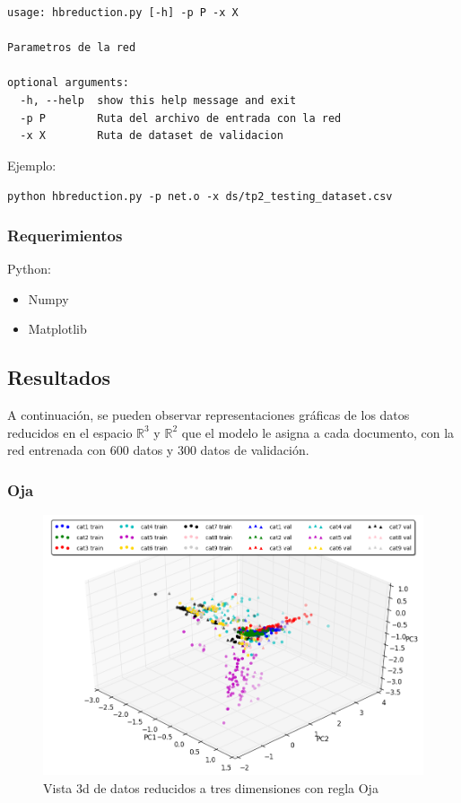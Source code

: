 \begin{lstlisting}[style=bash]
usage: hbreduction.py [-h] -p P -x X

Parametros de la red

optional arguments:
  -h, --help  show this help message and exit
  -p P        Ruta del archivo de entrada con la red
  -x X        Ruta de dataset de validacion
\end{lstlisting}

Ejemplo:

\noindent\texttt{python hbreduction.py -p net.o -x ds/tp2\_testing\_dataset.csv} 

\subsubsection{Requerimientos}

Python:
\begin{itemize}
\item Numpy 
\item Matplotlib
\end{itemize}

\subsection{Resultados}

A continuación, se pueden observar representaciones gráficas de los datos reducidos en el espacio $\mathbb{R}^3$ y $\mathbb{R}^2$ que el modelo le asigna a cada documento, con la red entrenada con 600 datos y 300 datos de validación.

\subsubsection{Oja}


\begin{figure}[ht!]
	\centering
	\includegraphics[width=0.8\linewidth]{img/parte1-vista3d-oja.png}

	\caption{Vista 3d de datos reducidos a tres dimensiones con regla Oja}
\end{figure}


